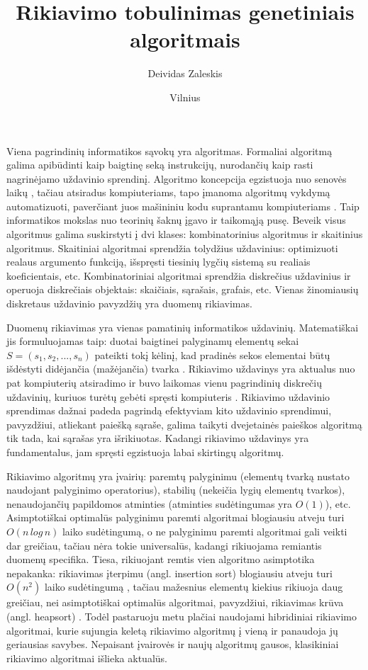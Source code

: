 \documentclass{VUMIFInfKursinis}
\institute{Informatikos institutas}  %
\title{Rikiavimo tobulinimas genetiniais algoritmais}
\author{Deividas Zaleskis}
\date{Vilnius \\ \the\year}
\begin{document}
\maketitle

\tableofcontents


Viena pagrindinių informatikos sąvokų yra algoritmas.
Formaliai algoritmą galima apibūdinti kaip
baigtinę seką instrukcijų, nurodančių kaip rasti nagrinėjamo uždavinio sprendinį.
Algoritmo koncepcija egzistuoja nuo senovės laikų \cite{knuth1972ancient}, tačiau atsiradus kompiuteriams,
tapo įmanoma algoritmų vykdymą automatizuoti, paverčiant juos mašininiu kodu suprantamu kompiuteriams \cite{wilkes1951preparation}.
Taip informatikos mokslas nuo teorinių šaknų \cite{turing1937computable} įgavo ir taikomąją pusę.
Beveik visus algoritmus galima suskirstyti į dvi klases: kombinatorinius algoritmus ir skaitinius algoritmus.
Skaitiniai algoritmai sprendžia tolydžius uždavinius: optimizuoti realaus argumento funkciją, išspręsti tiesinių lygčių sistemą su realiais koeficientais, etc.
Kombinatoriniai algoritmai sprendžia diskrečius uždavinius ir operuoja diskrečiais objektais: skaičiais, sąrašais, grafais, etc.
Vienas žinomiausių diskretaus uždavinio pavyzdžių yra duomenų rikiavimas.

Duomenų rikiavimas yra vienas pamatinių informatikos uždavinių.
Matematiškai jis formuluojamas taip:
duotai baigtinei palyginamų elementų sekai $S = (s_1, s_2, ..., s_n)$ pateikti tokį
kėlinį, kad pradinės sekos elementai būtų išdėstyti didėjančia (mažėjančia) tvarka \cite{Radavičius_Baranauskas_2013}.
Rikiavimo uždavinys yra aktualus nuo pat kompiuterių atsiradimo ir buvo laikomas vienu 
pagrindinių diskrečių uždavinių, kuriuos turėtų gebėti spręsti kompiuteris \cite{10.1145/356580.356581}.
Rikiavimo uždavinio sprendimas dažnai padeda pagrindą efektyviam kito uždavinio sprendimui,
pavyzdžiui, atliekant paiešką sąraše, galima taikyti dvejetainės paieškos algoritmą tik tada,
kai sąrašas yra išrikiuotas.
Kadangi rikiavimo uždavinys yra fundamentalus, jam spręsti egzistuoja labai skirtingų algoritmų.

Rikiavimo algoritmų yra įvairių:
paremtų palyginimu (elementų tvarką nustato naudojant palyginimo operatorius),
stabilių (nekeičia lygių elementų tvarkos),
nenaudojančių papildomos atminties (atminties sudėtingumas yra $O(1)$), etc.
Asimptotiškai optimalūs palyginimu paremti algoritmai blogiausiu atveju turi $O(n\,log\,n)$ laiko sudėtingumą,
o ne palyginimu paremti algoritmai gali veikti dar greičiau, tačiau nėra tokie universalūs, kadangi rikiuojama remiantis duomenų specifika.
Tiesa, rikiuojant remtis vien algoritmo asimptotika nepakanka:
rikiavimas įterpimu (angl. insertion sort) blogiausiu atveju turi $O(n^2)$ laiko sudėtingumą \cite{bender2006insertion},
tačiau mažesnius elementų kiekius rikiuoja daug greičiau, nei asimptotiškai optimalūs algoritmai,
pavyzdžiui, rikiavimas krūva (angl. heapsort) \cite{10.1145/512274.512284}.
Todėl pastaruoju metu plačiai naudojami hibridiniai rikiavimo algoritmai, kurie sujungia keletą rikiavimo
algoritmų į vieną ir panaudoja jų geriausias savybes.
Nepaisant įvairovės ir naujų algoritmų gausos, klasikiniai rikiavimo algoritmai išlieka aktualūs. %
\end{document}
